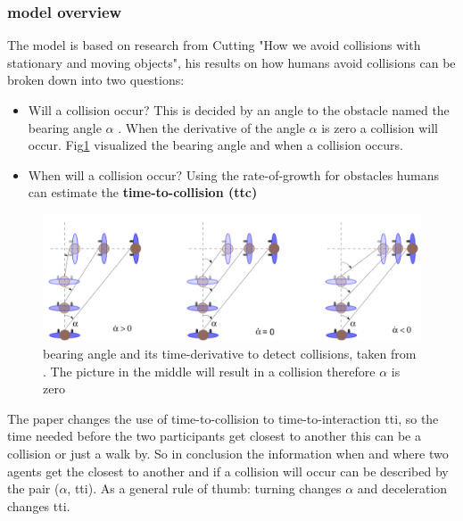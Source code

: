 \documentclass{acmsiggraph}               %
\begin{document}
\subsubsection{model overview}

The model is based on research from Cutting "How we avoid collisions with stationary and moving objects", his results on how humans avoid collisions can be broken down into two questions: 
\begin{itemize}
\item Will a collision occur? This is decided by an angle to the obstacle named the bearing angle $\alpha$ . When the derivative of the angle \textbf{\.{$\alpha$}} is zero a collision will occur. Fig\ref{fig:visualBearingangle} visualized the bearing angle and when a collision occurs.
\item When will a collision occur? Using the rate-of-growth for obstacles humans can estimate the \textbf{time-to-collision (ttc)}
\end{itemize}
\begin{figure}[h]
  \centering
  \includegraphics[width=1\linewidth]{images/visualApproach-bearingAngle.png}
  \caption{bearing angle and its time-derivative to detect collisions, taken from \protect\cite{ondrej_synthetic-vision_2010}. The picture in the middle will result in a collision therefore \.{$\alpha$} is zero}
  \label{fig:visualBearingangle}
\end{figure}
The paper changes the use of time-to-collision to time-to-interaction tti, so the time needed before the two participants get closest to another this can be a collision or just a walk by. So in conclusion the information when and where two agents get the closest to another and if a collision will occur can be described by the pair (\.{$\alpha$}, tti). As a general rule of thumb: turning changes \.{$\alpha$} and deceleration changes tti. 
\end{document}
